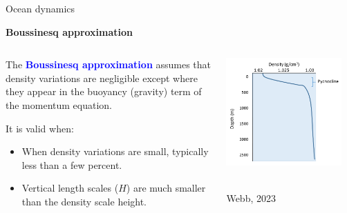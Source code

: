 \documentclass[aspectratio=169,xcolor=dvipsnames]{beamer}
\newcommand\boldblue[1]{\textcolor{blue}{\textbf{#1}}}
\newcommand\credit[2]{
        \\ \vspace{-0.5em}
        {\color{gray}\scriptsize
        \hfill
        #1
        \hspace{#2}}
        }
\begin{document}

\begin{frame}[t]{Ocean dynamics}

\vspace{-1.0em}

\begin{center}
\textbf{{\large
Boussinesq approximation
}}
\end{center}

\small 
\center 

\vspace{-0.5em}

\begin{columns}
    \begin{column}{0.5\textwidth}
        \begin{flushleft}
            
            The \boldblue{Boussinesq approximation} assumes that density variations are negligible except where they appear in the buoyancy (gravity) term of the momentum equation.
            
            It is valid when:
            \begin{itemize}
                \item When density variations are small, typically less than a few percent.
                \item Vertical length scales ($H$) are much smaller than the density scale height.
            \end{itemize}
        
        \end{flushleft}
    \end{column}
    \begin{column}{0.5\textwidth}
        \includegraphics[width=0.9\textwidth]{figs/Fig-ocean-density-column-figure6.3.2.png}
        \credit{Webb, 2023}{40px}
    \end{column}
\end{columns}
        
\end{frame}
\end{document}
